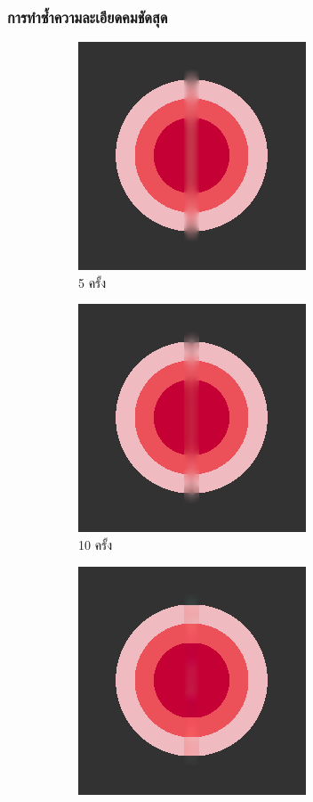 \documentclass[xcolor=dvipsnames, xetex,serif]{beamer}
\numberwithin{equation}{section}
\begin{document}
    \begin{frame}
        \frametitle{การทำซ้ำความละเอียดคมชัดสุด}
        \begin{figure}[H]
            \centering
            \begin{subfigure}{0.4\linewidth}
                \centering
                \includegraphics[width=0.6\linewidth]{images/just10enough/only5time.png}
                \caption{5 ครั้ง}
            \end{subfigure}
            \begin{subfigure}{0.4\linewidth}
                \centering
                \includegraphics[width=0.6\linewidth]{images/just10enough/only10time.png}
                \caption{10 ครั้ง}
            \end{subfigure}
            \begin{subfigure}{0.4\linewidth}
                \centering
                \includegraphics[width=0.6\linewidth]{images/just10enough/only50time.png}			

\end{subfigure}
\end{figure}
\end{frame}
\end{document}
